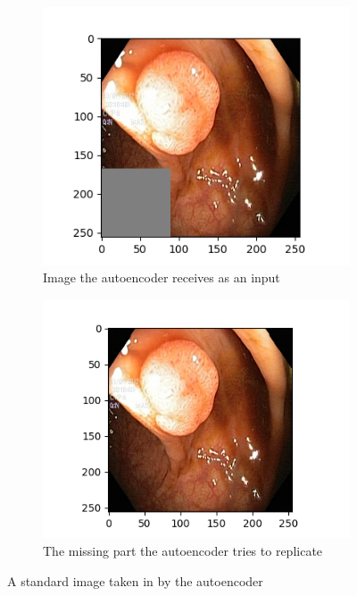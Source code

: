 \begin{figure}[t]
\centering
\begin{subfigure}[b]{0.4\textwidth}
    \centering
    \includegraphics[width=\textwidth]{methodology/figures/masked_img.png}
    \caption[Hate to be this guy]
    {{\small Image the autoencoder receives as an input }}    
    \label{fig:AErec}
\end{subfigure}
\qquad
\begin{subfigure}[b]{0.42\textwidth}  
    \centering 
    \includegraphics[width=\textwidth]{methodology/figures/whole_img.png}
    \caption[Hate to be this guy]%
    {{\small The missing part the autoencoder tries to replicate}}    
    \label{fig:AErep}
\end{subfigure}
\caption[Hate to be this guy]
{\small A standard image taken in by the autoencoder} 
\label{fig:AEmasks}
\end{figure}

